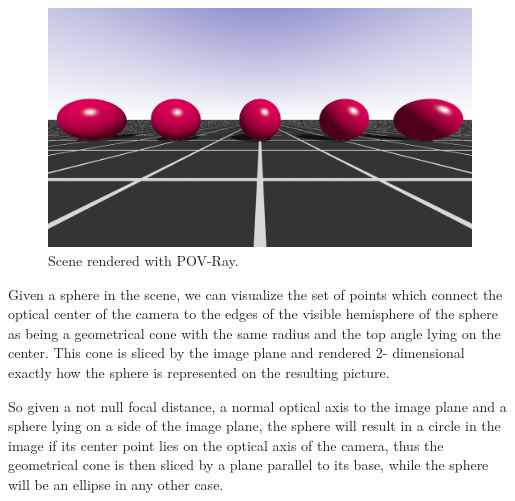 \documentclass[a4paper,twocolumn]{article}
\begin{document}
	\begin{figure}[h]
		\centering
		\includegraphics[width=\columnwidth]{images/task_1c.png}
		\caption{Scene rendered with POV-Ray.}
		\label{fig:povray_scene}
	\end{figure}
		
	Given a sphere in the scene, we can visualize the set of points which connect the optical center of the camera to the edges of the visible hemisphere of the sphere as being a geometrical cone with the same radius and the top angle lying on the center. This cone is sliced by the image plane and rendered 2- dimensional exactly how the sphere is represented on the resulting picture. \newline
	
	So given a not null focal distance, a normal optical axis to the image plane and a sphere lying on a side of the image plane, the sphere will result in a circle in the image if its center point lies on the optical axis of the camera, thus the geometrical cone is then sliced by a plane parallel to its base, while the sphere will be an ellipse in any other case.
\end{document}
